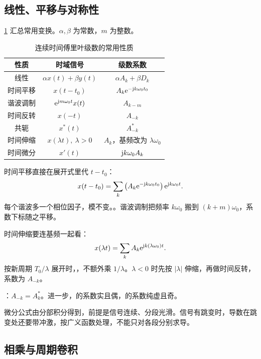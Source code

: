 \subsection{线性、平移与对称性}
\label{subsec:fs-basic-properties}

\cref{tab:ctfs-properties} 汇总常用变换。$\alpha,\beta$ 为常数，$m$ 为整数。
\begin{table}[H]
  \centering
  \caption{连续时间傅里叶级数的常用性质}
  \label{tab:ctfs-properties}
  \begingroup
  \renewcommand{\arraystretch}{1.5}
  \begin{tabular}{c c c}
    \toprule
    性质 & 时域信号 & 级数系数 \\
    \midrule
    线性 & $\alpha x(t)+\beta y(t)$ & $\alpha A_k+\beta D_k$ \\
    时间平移 & $x(t-t_0)$ & $A_k\mathrm{e}^{-\mathrm{j} k\omega_0t_0}$ \\
    谐波调制 & $\mathrm{e}^{\mathrm{j} m\omega_0t}x(t)$ & $A_{k-m}$ \\
    时间反转 & $x(-t)$ & $A_{-k}$ \\
    共轭 & $x^*(t)$ & $A_{-k}^*$ \\
    时间伸缩 & $x(\lambda t),\ \lambda>0$ & $A_k$，基频改为 $\lambda\omega_0$ \\
    时间微分 & $x'(t)$ & $\mathrm{j} k\omega_0A_k$ \\
    \bottomrule
  \end{tabular}
  \endgroup
\end{table}

时间平移直接在展开式里代 $t-t_0$：
\[
  x(t-t_0)=\sum_k
  \left(A_k\mathrm{e}^{-\mathrm{j} k\omega_0t_0}\right)\mathrm{e}^{\mathrm{j} k\omega_0t}.
\]
每个谐波多一个相位因子，模不变。。谐波调制把频率 $k\omega_0$ 搬到 $(k+m)\omega_0$，系数下标随之平移。

时间伸缩要连基频一起看：
\[
  x(\lambda t)=\sum_k A_k\mathrm{e}^{\mathrm{j} k(\lambda\omega_0)t}.
\]
按新周期 $T_0/\lambda$ 展开时，，不额外乘 $1/\lambda$。$\lambda<0$ 时先按 $|\lambda|$ 伸缩，再做时间反转，系数为 $A_{-k}$。

：$A_{-k}=A_k^*$。进一步，的系数实且偶，的系数纯虚且奇。

微分公式由分部积分得到，前提是信号连续、分段光滑。信号有跳变时，导数在跳变处还要带冲激，按广义函数处理，不能只对各段分别求导。

\subsection{相乘与周期卷积}
\label{subsec:fs-product-periodic-convolution}

